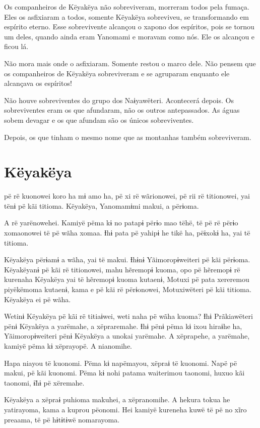 Os companheiros de Këyakëya não sobreviveram, morreram todos pela
fumaça. Eles os asfixiaram a todos, somente Këyakëya sobreviveu, se
transformando em espírito eterno. Esse sobrevivente alcançou o xapono dos
espíritos, pois se tornou um deles, quando ainda eram Yanomami e moravam
como nós. Ele os alcançou e ficou lá. 

Não mora mais onde o asfixiaram. Somente restou o marco dele. Não pensem
que os companheiros de Këyakëya sobreviveram e se agruparam enquanto ele
alcançava os espíritos! 

Não houve sobreviventes do grupo dos Naɨyawëteri. Acontecerá depois. Os
sobreviventes eram os que afundaram, não os outros antepassados. As
águas sobem devagar e os que afundam são os únicos sobreviventes. 

Depois, os que tinham o mesmo nome que as montanhas também
sobreviveram.

\chapter{Këyakëya}

 pë rë kuonowei koro ha mɨ amo ha, pë xi rë wãrionowei, pë rii rë
titionowei, yai tënɨ pë kãi titioma. Këyakëya, Yanomamɨmi makui, a
përɨoma. 

A rë yarënowehei. Kamiyë pëma kɨ no patapɨ përɨo mao tëhë, të pë rë
përɨo xomaonowei të pë wãha xomaa. Ɨhɨ pata pë yahipɨ he tikë ha,
pëɨxokɨ ha, yai të titioma. 

Këyakëya përɨamɨ a wãha, yai të makui. Ɨhɨnɨ Yãimoropɨweiteri pë kãi
përɨoma. Këyakëyanɨ pë kãi rë titionowei, mahu hẽremopɨ kuoma, opo pë
hẽremopɨ rë kurenaha Këyakëya yai të hẽremopɨ kuoma kutaenɨ, Motuxi pë
pata xereremou piyëkëmoma kutaenɨ, kama e pë kãi rë përɨonowei,
Motuxiwëteri pë kãi titioma. Këyakëya ei pë wãha. 

Wetinɨ Këyakëya pë kãi rë titiaɨwei, weti naha pë wãha kuoma? Ɨhɨ
Prãkiawëteri pënɨ Këyakëya a yarëmahe, a xëpraremahe. Ɨhɨ pënɨ pëma kɨ
ixou hiraɨhe ha, Yãimoropɨweiteri pënɨ Këyakëya a unokai yarëmahe. A xëprapehe, a yarëmahe, kamiyë pëma kɨ xëprayopë. A nianomihe. 

Hapa niayou të kuonomi. Pëma kɨ napëmayou, xëpraɨ të kuonomi. Napë pë
makui, pë kãi kuonomi. Pëma kɨ nohi patama waiterimou taonomi, huxuo kãi
taonomi, ɨ̃hɨ pë xëremahe. 

Këyakëya a xëpraɨ puhioma makuhei, a xëpranomihe. A hekura tokua he
yatirayoma, kama a kuprou pëonomi. Hei kamiyë kureneha kuwë të pë no
xĩro preaama, të pë hɨtɨtɨwë nomarayoma. 

